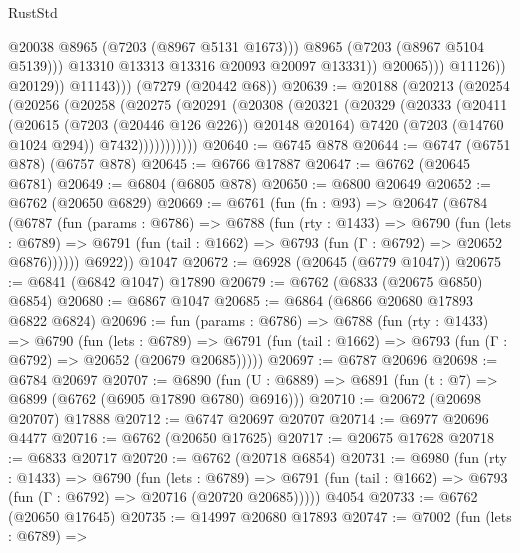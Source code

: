 \begin{lexlean}{RustStd}
\begin{coremodule}
                                @20038
                                @8965
                                (@7203 (@8967 @5131 @1673)))
                              @8965
                              (@7203 (@8967 @5104 @5139)))
                            @13310
                            @13313
                            @13316
                            @20093
                            @20097
                            @13331))
                        @20065)))
                  @11126))
              @20129))
          @11143)))
    (@7279 (@20442 @68))
@20639 := @20188
    (@20213
      (@20254
        (@20256
          (@20258
            (@20275
              (@20291
                (@20308
                  (@20321
                    (@20329
                      (@20333
                        (@20411
                          (@20615 (@7203 (@20446 @126 @226)) @20148 @20164)
                          @7420
                          (@7203 (@14760 @1024 @294))
                          @7432)))))))))))
@20640 := @6745 @878
@20644 := @6747 (@6751 @878) (@6757 @878)
@20645 := @6766 @17887
@20647 := @6762 (@20645 @6781)
@20649 := @6804 (@6805 @878)
@20650 := @6800 @20649
@20652 := @6762 (@20650 @6829)
@20669 := @6761
    (fun (fn : @93) =>
    @20647
      (@6784
        (@6787
          (fun (params : @6786) =>
          @6788
            (fun (rty : @1433) =>
            @6790
              (fun (lets : @6789) =>
              @6791 (fun (tail : @1662) => @6793 (fun (Γ : @6792) => @20652 @6876))))))
        @6922))
    @1047
@20672 := @6928 (@20645 (@6779 @1047))
@20675 := @6841 (@6842 @1047) @17890
@20679 := @6762 (@6833 (@20675 @6850) @6854)
@20680 := @6867 @1047
@20685 := @6864 (@6866 @20680 @17893 @6822 @6824)
@20696 := fun (params : @6786) =>
  @6788
    (fun (rty : @1433) =>
    @6790
      (fun (lets : @6789) =>
      @6791 (fun (tail : @1662) => @6793 (fun (Γ : @6792) => @20652 (@20679 @20685)))))
@20697 := @6787 @20696
@20698 := @6784 @20697
@20707 := @6890
    (fun (U : @6889) => @6891 (fun (t : @7) => @6899 (@6762 (@6905 @17890 @6780) @6916)))
@20710 := @20672 (@20698 @20707) @17888
@20712 := @6747 @20697 @20707
@20714 := @6977 @20696 @4477
@20716 := @6762 (@20650 @17625)
@20717 := @20675 @17628
@20718 := @6833 @20717
@20720 := @6762 (@20718 @6854)
@20731 := @6980
    (fun (rty : @1433) =>
    @6790
      (fun (lets : @6789) =>
      @6791 (fun (tail : @1662) => @6793 (fun (Γ : @6792) => @20716 (@20720 @20685)))))
    @4054
@20733 := @6762 (@20650 @17645)
@20735 := @14997 @20680 @17893
@20747 := @7002
    (fun (lets : @6789) =>

\end{coremodule}
\end{lexlean}
